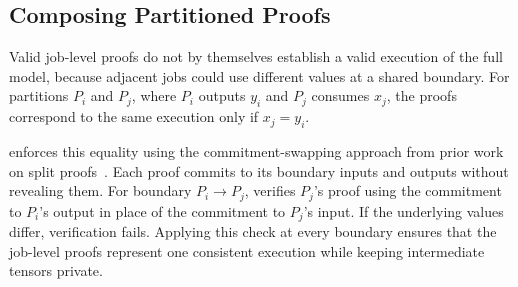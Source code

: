 
\subsection{Composing Partitioned Proofs}
\label{sec:proof-composition}

Valid job-level proofs do not by themselves establish a valid execution of the full model, because adjacent jobs could use different values at a shared boundary. For partitions \(P_i\) and \(P_j\), where \(P_i\) outputs \(y_i\) and \(P_j\) consumes \(x_j\), the proofs correspond to the same execution only if \(x_j = y_i\).

\TITLE{} enforces this equality using the commitment-swapping approach from prior work on split proofs~\cite{ezkl-splitting}. Each proof commits to its boundary inputs and outputs without revealing them. For boundary \(P_i \rightarrow P_j\), \TITLE{} verifies \(P_j\)'s proof using the commitment to \(P_i\)'s output in place of the commitment to \(P_j\)'s input. If the underlying values differ, verification fails. Applying this check at every boundary ensures that the job-level proofs represent one consistent execution while keeping intermediate tensors private.

